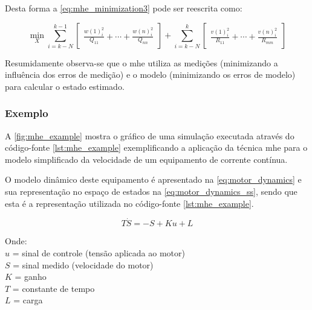Desta forma a \cref{eq:mhe_minimization3} pode ser reescrita como:

\begin{equation}
	\label{eq:mhe_minimization4}
	\min_{X} \sum_{i=k-N}^{k-1} \begin{bmatrix} \frac{w(1)^2_i}{Q_{11}} + \cdots + \frac{w(n)^2_i}{Q_{nn}} \end{bmatrix} + 
			\sum_{i=k-N}^{k} \begin{bmatrix} \frac{v(1)^2_i}{R_{11}} + \cdots + \frac{v(n)^2_i}{R_{mm}} \end{bmatrix}
\end{equation}

Resumidamente observa-se que o \acrshort{mhe} utiliza as medições (minimizando a influência dos
erros de medição) e o modelo (minimizando os erros de modelo) para calcular o estado estimado.

\subsubsection{Exemplo}
\label{subsubsec:mhe_example}

A \cref{fig:mhe_example} mostra o gráfico de uma simulação executada através do código-fonte \ref{lst:mhe_example}
exemplificando a aplicação da técnica \acrlong{mhe} para o modelo simplificado da velocidade de um equipamento de corrente
contínua.

O modelo dinâmico deste equipamento é apresentado na \cref{eq:motor_dynamics} e sua representação no espaço de estados
na \cref{eq:motor_dynamics_ss}, sendo que esta é a representação utilizada no código-fonte \ref{lst:mhe_example}.

\begin{equation}
	\label{eq:motor_dynamics}
	T \dot{S} = -S + Ku + L
\end{equation}

\noindent
Onde: 												\\
$u$ = sinal de controle (tensão aplicada ao motor)	\\
$S$ = sinal medido (velocidade do motor)			\\
$K$ = ganho 										\\
$T$ = constante de tempo 							\\
$L$ = carga

